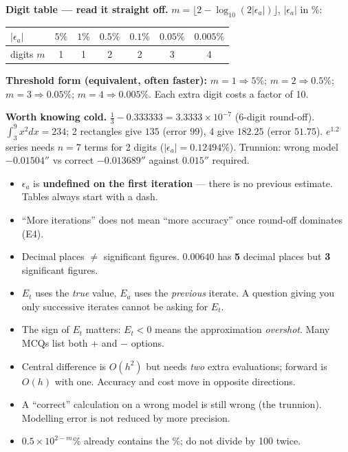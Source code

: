 \begin{numbox}
\textbf{Digit table --- read it straight off.} $m = \lfloor 2-\log_{10}(2|\epsilon_a|)\rfloor$, $|\epsilon_a|$ in \%:
\begin{center}\small
\begin{tabular}{@{}lcccccc@{}}
\toprule
$|\epsilon_a|$ & $5\%$ & $1\%$ & $0.5\%$ & $0.1\%$ & $0.05\%$ & $0.005\%$\\
\midrule
digits $m$ & 1 & 1 & 2 & 2 & 3 & 4\\
\bottomrule
\end{tabular}
\end{center}
\textbf{Threshold form (equivalent, often faster):} $m=1 \Rightarrow 5\%$; $m=2 \Rightarrow 0.5\%$; $m=3 \Rightarrow 0.05\%$; $m=4 \Rightarrow 0.005\%$. Each extra digit costs a factor of 10.

\smallskip
\textbf{Worth knowing cold.} $\tfrac13 - 0.333333 = 3.3333\times10^{-7}$ (6-digit round-off). $\int_3^9 x^2dx = 234$; 2 rectangles give $135$ (error $99$), 4 give $182.25$ (error $51.75$). $e^{1.2}$ series needs $n=7$ terms for 2 digits ($|\epsilon_a| = 0.12494\%$). Trunnion: wrong model $-0.01504''$ vs correct $-0.013689''$ against $0.015''$ required.
\end{numbox}

\begin{trapbox}
\begin{itemize}
\item $\epsilon_a$ is \textbf{undefined on the first iteration} --- there is no previous estimate. Tables always start with a dash.
\item ``More iterations'' does not mean ``more accuracy'' once round-off dominates (E4).
\item Decimal places $\ne$ significant figures. $0.00640$ has \textbf{5} decimal places but \textbf{3} significant figures.
\item $E_t$ uses the \emph{true} value, $E_a$ uses the \emph{previous} iterate. A question giving you only successive iterates cannot be asking for $E_t$.
\item The sign of $E_t$ matters: $E_t<0$ means the approximation \emph{overshot}. Many MCQs list both $+$ and $-$ options.
\item Central difference is $O(h^2)$ but needs \emph{two} extra evaluations; forward is $O(h)$ with one. Accuracy and cost move in opposite directions.
\item A ``correct'' calculation on a wrong model is still wrong (the trunnion). Modelling error is not reduced by more precision.
\item $0.5\times10^{2-m}\%$ already contains the \%; do not divide by 100 twice.
\end{itemize}
\end{trapbox}

